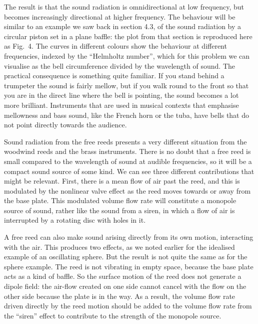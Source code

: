   The result is that the sound radiation is omnidirectional at low frequency, 
  but becomes increasingly directional at higher frequency. The behaviour will 
  be similar to an example we saw back in section 4.3, of the sound radiation 
  by a circular piston set in a plane baffle: the plot from that section is 
  reproduced here as Fig.\ 4. The curves in different colours show the 
  behaviour at different frequencies, indexed by the “Helmholtz number”, which 
  for this problem we can visualise as the bell circumference divided by the 
  wavelength of sound. The practical consequence is something quite familiar. 
  If you stand behind a trumpeter the sound is fairly mellow, but if you walk 
  round to the front so that you are in the direct line where the bell is 
  pointing, the sound becomes a lot more brilliant. Instruments that are used 
  in musical contexts that emphasise mellowness and bass sound, like the French 
  horn or the tuba, have bells that do not point directly towards the audience. 

  Sound radiation from the free reeds presents a very different situation from 
  the woodwind reeds and the brass instruments. There is no doubt that a free 
  reed is small compared to the wavelength of sound at audible frequencies, so 
  it will be a compact sound source of some kind. We can see three different 
  contributions that might be relevant. First, there is a mean flow of air past 
  the reed, and this is modulated by the nonlinear valve effect as the reed 
  moves towards or away from the base plate. This modulated volume flow rate 
  will constitute a monopole source of sound, rather like the sound from a 
  siren, in which a flow of air is interrupted by a rotating disc with holes in 
  it. 

  A free reed can also make sound arising directly from its own motion, 
  interacting with the air. This produces two effects, as we noted earlier for 
  the idealised example of an oscillating sphere. But the result is not quite 
  the same as for the sphere example. The reed is not vibrating in empty space, 
  because the base plate acts as a kind of baffle. So the surface motion of the 
  reed does not generate a dipole field: the air-flow created on one side 
  cannot cancel with the flow on the other side because the plate is in the 
  way. As a result, the volume flow rate driven directly by the reed motion 
  should be added to the volume flow rate from the “siren” effect to contribute 
  to the strength of the monopole source. 

